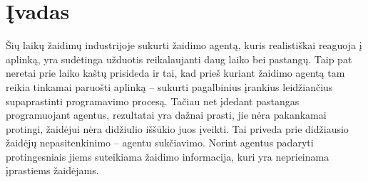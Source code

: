 \documentclass[a4paper, 12pt]{article}
\begin{document}
\tableofcontents
\newpage

\cleardoublepage
{}
{}
\listoffigures
\newpage

\cleardoublepage
{}
{}
\listoftables
\newpage



\section*{Įvadas}
{}
%
Šių laikų žaidimų industrijoje sukurti žaidimo agentą, kuris realistiškai reaguoja į aplinką, yra sudėtinga užduotis reikalaujanti daug laiko bei pastangų. Taip pat neretai prie laiko kaštų prisideda ir tai, kad prieš kuriant žaidimo agentą tam reikia tinkamai paruošti aplinką – sukurti pagalbinius įrankius leidžiančius supaprastinti programavimo procesą. Tačiau net įdedant pastangas programuojant agentus, rezultatai yra dažnai prasti, jie nėra pakankamai protingi, žaidėjui nėra didžiulio iššūkio juos įveikti. Tai priveda prie didžiausio žaidėjų nepasitenkinimo – agentu sukčiavimo. Norint agentus padaryti protingesniais jiems suteikiama žaidimo informacija, kuri yra neprieinama įprastiems žaidėjams. 
\end{document}
